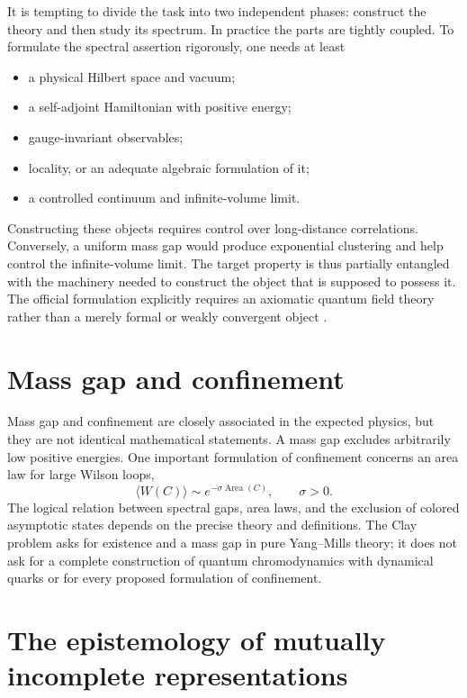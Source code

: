 \documentclass[11pt]{article}
\begin{document}
It is tempting to divide the task into two independent phases: construct the
theory and then study its spectrum.  In practice the parts are tightly coupled.
To formulate the spectral assertion rigorously, one needs at least
\begin{itemize}[leftmargin=2em]
  \item a physical Hilbert space and vacuum;
  \item a self-adjoint Hamiltonian with positive energy;
  \item gauge-invariant observables;
  \item locality, or an adequate algebraic formulation of it;
  \item a controlled continuum and infinite-volume limit.
\end{itemize}
Constructing these objects requires control over long-distance correlations.
Conversely, a uniform mass gap would produce exponential clustering and help
control the infinite-volume limit.  The target property is thus partially
entangled with the machinery needed to construct the object that is supposed
to possess it.  The official formulation explicitly requires an axiomatic
quantum field theory rather than a merely formal or weakly convergent object
\cite{jaffe-witten,douglas}.

\section{Mass gap and confinement}

Mass gap and confinement are closely associated in the expected physics, but
they are not identical mathematical statements.  A mass gap excludes
arbitrarily low positive energies.  One important formulation of confinement
concerns an area law for large Wilson loops,
\begin{equation}
  \langle W(C)\rangle
  \sim e^{-\sigma\operatorname{Area}(C)},
  \qquad \sigma>0.
  \label{eq:area-law}
\end{equation}
The logical relation between spectral gaps, area laws, and the exclusion of
colored asymptotic states depends on the precise theory and definitions.  The
Clay problem asks for existence and a mass gap in pure Yang--Mills theory; it
does not ask for a complete construction of quantum chromodynamics with
dynamical quarks or for every proposed formulation of confinement.

\section{The epistemology of mutually incomplete representations}
\end{document}

